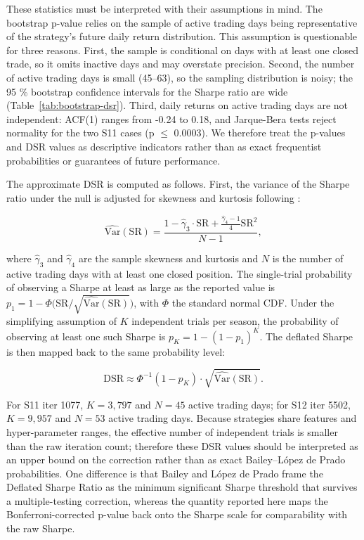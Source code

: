\documentclass[11pt,a4paper]{article}
\begin{document}
These statistics must be interpreted with their assumptions in mind. The bootstrap p-value relies on the sample of active trading days being representative of the strategy's future daily return distribution. This assumption is questionable for three reasons. First, the sample is conditional on days with at least one closed trade, so it omits inactive days and may overstate precision. Second, the number of active trading days is small (45--63), so the sampling distribution is noisy; the 95 \% bootstrap confidence intervals for the Sharpe ratio are wide (Table~\ref{tab:bootstrap-dsr}). Third, daily returns on active trading days are not independent: ACF(1) ranges from -0.24 to 0.18, and Jarque-Bera tests reject normality for the two S11 cases (p $\leq$ 0.0003). We therefore treat the p-values and DSR values as descriptive indicators rather than as exact frequentist probabilities or guarantees of future performance.

The approximate DSR is computed as follows. First, the variance of the Sharpe ratio under the null is adjusted for skewness and kurtosis following \citep{lo_2002}:

\[\widehat{\mathrm{Var}}(\mathrm{SR}) = \frac{1 - \hat{\gamma}_3 \cdot \mathrm{SR} + \frac{\hat{\gamma}_4 - 1}{4} \mathrm{SR}^2}{N - 1},\]

where \(\hat{\gamma}_3\) and \(\hat{\gamma}_4\) are the sample skewness and kurtosis and \(N\) is the number of active trading days with at least one closed position. The single-trial probability of observing a Sharpe at least as large as the reported value is \(p_1 = 1 - \Phi\big(\mathrm{SR} / \sqrt{\widehat{\mathrm{Var}}(\mathrm{SR})}\big)\), with \(\Phi\) the standard normal CDF. Under the simplifying assumption of \(K\) independent trials per season, the probability of observing at least one such Sharpe is \(p_K = 1 - (1 - p_1)^K\). The deflated Sharpe is then mapped back to the same probability level:

\[\mathrm{DSR} \approx \Phi^{-1}(1 - p_K) \cdot \sqrt{\widehat{\mathrm{Var}}(\mathrm{SR})}.\]

For S11 iter 1077, \(K = 3,797\) and \(N = 45\) active trading days; for S12 iter 5502, \(K = 9,957\) and \(N = 53\) active trading days. Because strategies share features and hyper-parameter ranges, the effective number of independent trials is smaller than the raw iteration count; therefore these DSR values should be interpreted as an upper bound on the correction rather than as exact Bailey--López de Prado probabilities. One difference is that Bailey and López de Prado \citep{bailey_2014} frame the Deflated Sharpe Ratio as the minimum significant Sharpe threshold that survives a multiple-testing correction, whereas the quantity reported here maps the Bonferroni-corrected p-value back onto the Sharpe scale for comparability with the raw Sharpe.
\end{document}
